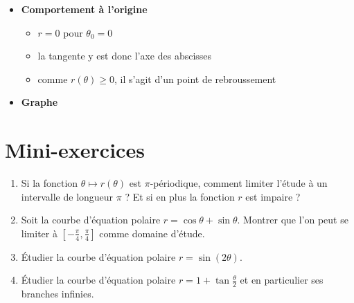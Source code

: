  \begin{frame}
\begin{exemple}
\begin{itemize}
 
  \item \textbf{Comportement à l'origine} 
  \begin{itemize}
    \pause\item $r=0$ pour $\theta_0=0$
    \pause\item la tangente y est donc l'axe des abscisses
    \pause\item comme $r(\theta)\ge0$, il s'agit d'un point de rebroussement
  \end{itemize}

  \pause
  \item \textbf{Graphe} 
\end{itemize}

\vspace*{-6ex}


\end{exemple}

\end{frame}





\section{Mini-exercices}

\begin{frame}
\begin{miniexercice}
\begin{enumerate}
  \item Si la fonction $\theta \mapsto r(\theta)$ est 
  $\pi$-périodique, comment limiter l'étude à un intervalle 
  de longueur $\pi$ ? Et si en plus la fonction $r$ est impaire ?
      
  \item Soit la courbe d'équation polaire $r=\cos\theta+\sin\theta$.
  Montrer que l'on peut se limiter à $[-\frac{\pi}{4},\frac{\pi}{4}]$
  comme domaine d'étude.
   
  \item \'Etudier la courbe d'équation polaire $r = \sin(2\theta)$.
  
  \item \'Etudier la courbe d'équation polaire $r = 1+\tan \frac \theta2$ et en particulier ses
  branches infinies.
  
\end{enumerate}
\end{miniexercice}
\end{frame}


